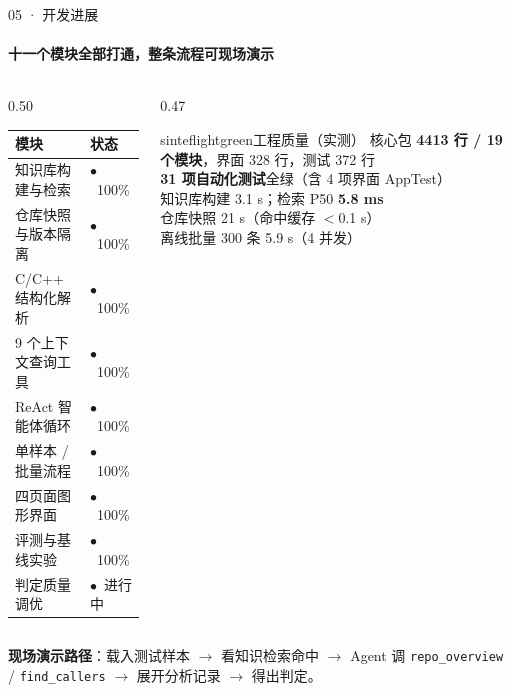 \documentclass{beamer}
\newcommand{\good}{\textcolor{sintefgreen}{$\bullet$}}
\newcommand{\warn}{\textcolor{sintefyellow}{$\bullet$}}
\begin{document}
\begin{frame}{05 · 开发进展}
\framesubtitle{十一个模块全部打通，整条流程可现场演示}
\scriptsize
\begin{columns}[t]
\begin{column}{0.50\textwidth}
\begin{tabular}{@{}p{}p{}@{}}
\toprule
\textbf{模块} & \textbf{状态} \\
\midrule
知识库构建与检索 & \good\ 100\% \\
仓库快照与版本隔离 & \good\ 100\% \\
C/C++ 结构化解析 & \good\ 100\% \\
9 个上下文查询工具 & \good\ 100\% \\
ReAct 智能体循环 & \good\ 100\% \\
单样本 / 批量流程 & \good\ 100\% \\
四页面图形界面 & \good\ 100\% \\
评测与基线实验 & \good\ 100\% \\
判定质量调优 & \warn\ 进行中 \\
\bottomrule
\end{tabular}
\end{column}
\begin{column}{0.47\textwidth}
\begin{colorblock}[black]{sinteflightgreen}{工程质量（实测）}
\tiny
核心包 \textbf{4413 行 / 19 个模块}，界面 328 行，测试 372 行\\[0.2em]
\textbf{31 项自动化测试}全绿（含 4 项界面 AppTest）\\[0.2em]
知识库构建 3.1 s；检索 P50 \textbf{5.8 ms}\\[0.2em]
仓库快照 21 s（命中缓存 $<$0.1 s）\\[0.2em]
离线批量 300 条 5.9 s（4 并发）
\end{colorblock}
\end{column}
\end{columns}

\vspace{0.5em}
{\scriptsize \textbf{现场演示路径}：载入测试样本 $\rightarrow$ 看知识检索命中
$\rightarrow$ Agent 调 \texttt{repo\_overview} / \texttt{find\_callers}
$\rightarrow$ 展开分析记录 $\rightarrow$ 得出判定。}
\end{frame}
\end{document}
